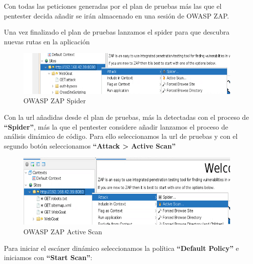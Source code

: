 Con todas las peticiones generadas por el plan de pruebas más las que el pentester decida añadir se irán almacenado 
en una sesión de OWASP ZAP.

Una vez finalizado el plan de pruebas lanzamos el spider para que descubra nuevas rutas en la aplicación

\begin{figure}[!htb]
    \captionsetup{width=1\linewidth}  
    \includegraphics[width=\linewidth]{./imagenes/03_01_WebGoat_ZapProxySpider.png}
    \caption{OWASP ZAP Spider}  
    \label{fig:OWASPZap Spider}
\end{figure}

\newpage
Con la url añadidas desde el plan de pruebas, más la detectadas con el proceso de \textbf{“Spider”}, más la que el 
pentester considere añadir lanzamos el proceso de análisis dinámico de código. Para ello seleccionamos la url de pruebas 
y con el segundo botón seleccionamos \textbf{“Attack > Active Scan”}

\begin{figure}[!htb]
    \centering
    \captionsetup{width=1\linewidth}  
    \includegraphics[width=\linewidth]{./imagenes/03_02_WebGoat_ZapProxyActiveScan.png}
    \caption{OWASP ZAP Active Scan}  
    \label{fig:OWASPZap Active Scan}
\end{figure}

Para iniciar el escáner dinámico seleccionamos la política \textbf{“Default Policy”} e iniciamos con \textbf{“Start Scan”}:


